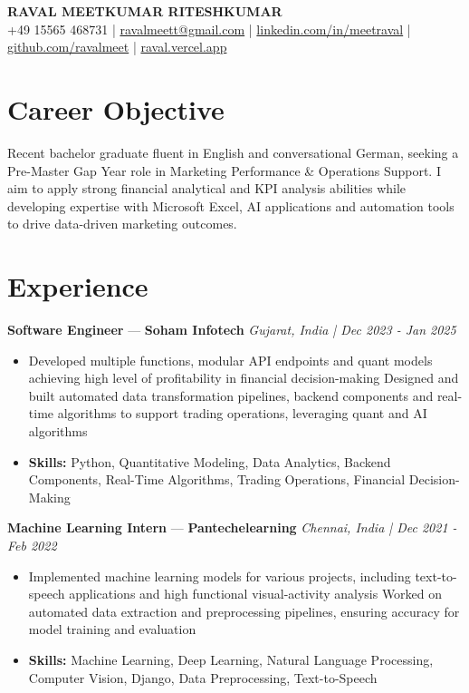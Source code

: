 \documentclass[a4paper,10pt]{article}
\begin{document}
\begin{center}
  {\Large\bfseries RAVAL MEETKUMAR RITESHKUMAR}\\[2pt]
  {\small +49 15565 468731 \;|\; \href{mailto:ravalmeett@gmail.com}{ravalmeett@gmail.com} \;|\; \href{https://www.linkedin.com/in/meetraval/}{linkedin.com/in/meetraval} \;|\; \href{https://github.com/ravalmeet}{github.com/ravalmeet} \;|\; \href{https://raval.vercel.app/}{raval.vercel.app}}
\end{center}
\vspace{-3pt}

\section*{Career Objective}
Recent bachelor graduate fluent in English and conversational German, seeking a Pre-Master Gap Year role in Marketing Performance \& Operations Support. I aim to apply strong financial analytical and KPI analysis abilities while developing expertise with Microsoft Excel, AI applications and automation tools to drive data-driven marketing outcomes.\par

\section*{Experience}
\textbf{Software Engineer} — \textbf{Soham Infotech} \hfill \textit{Gujarat, India \;|\; Dec 2023 - Jan 2025}\par
\vspace{1pt}
\begin{itemize}
  \item Developed multiple functions, modular API endpoints and quant models achieving high level of profitability in financial decision-making Designed and built automated data transformation pipelines, backend components and real-time algorithms to support trading operations, leveraging quant and AI algorithms
  \item \textbf{Skills:} Python, Quantitative Modeling, Data Analytics, Backend Components, Real-Time Algorithms, Trading Operations, Financial Decision-Making
\end{itemize}
\vspace{3pt}
\textbf{Machine Learning Intern} — \textbf{Pantechelearning} \hfill \textit{Chennai, India \;|\; Dec 2021 - Feb 2022}\par
\vspace{1pt}
\begin{itemize}
  \item Implemented machine learning models for various projects, including text-to-speech applications and high functional visual-activity analysis Worked on automated data extraction and preprocessing pipelines, ensuring accuracy for model training and evaluation
  \item \textbf{Skills:} Machine Learning, Deep Learning, Natural Language Processing, Computer Vision, Django, Data Preprocessing, Text-to-Speech
\end{itemize}
\end{document}
